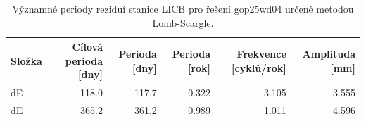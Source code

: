 \begin{table}[H]
\centering
\caption{Významné periody reziduí stanice LICB pro řešení gop25wd04 určené metodou Lomb-Scargle.}
\label{tab:gop25wd04_stcd_licb_detr_weighted_multiseg_spectral_lomb_scargle_significant_periods}
\begin{tabular}{lrrrrr}
\toprule
Složka & Cílová perioda [dny] & Perioda [dny] & Perioda [rok] & Frekvence [cyklů/rok] & Amplituda [mm] \\
\midrule
dE & 118.0 & 117.7 & 0.322 & 3.105 & 3.555 \\
dE & 365.2 & 361.2 & 0.989 & 1.011 & 4.596 \\
\bottomrule
\end{tabular}
\end{table}
